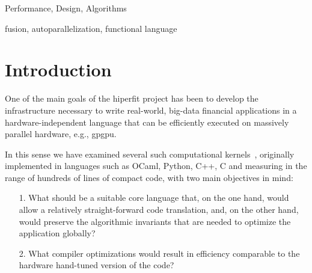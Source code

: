 \documentclass{sigplanconf}  %
\begin{document}


\terms
Performance, Design, Algorithms

\keywords
fusion, autoparallelization, functional language

\section{Introduction}
\label{sec:Introduction}

One of the main goals of the {\sc hiperfit} project has been to
develop the infrastructure necessary to write real-world, big-data 
financial applications in a hardware-independent language that can 
be efficiently executed on massively parallel hardware, e.g., {\sc gpgpu}.  

In this sense we have examined several such computational kernels~\cite{LexiFiPricing}, 
originally implemented in languages such as OCaml, Python, C++, C
and measuring in the range of hundreds of lines of compact code, 
with two main objectives in mind: 
\begin{itemize}
    \item[1.] What should be a suitable core language that, on the
                one hand, would allow a relatively straight-forward 
                code translation, and, on the other hand, would
                preserve the algorithmic invariants that are needed
                to optimize the application globally?
    \item[2.] What compiler optimizations would result in efficiency
                comparable to the hardware hand-tuned version 
                of the code?
\end{itemize}
\end{document}

